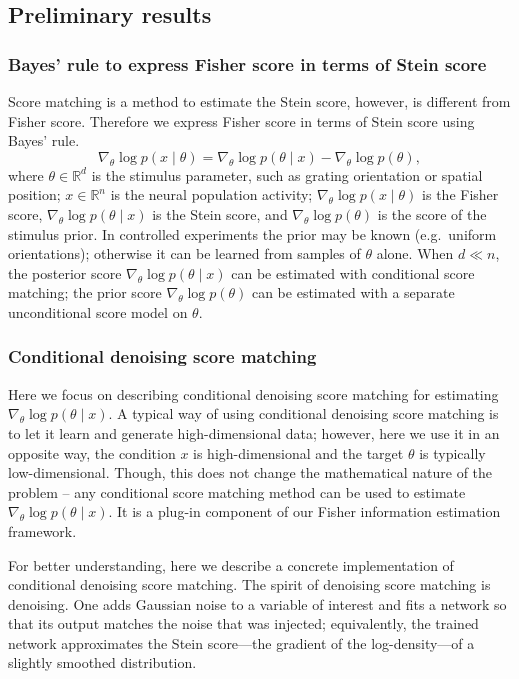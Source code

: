 \subsection{Preliminary results}
\subsubsection{Bayes' rule to express Fisher score in terms of Stein score}

Score matching is a method to estimate the Stein score, however, is different from Fisher score. Therefore we express Fisher score in terms of Stein score using Bayes' rule.
\begin{equation}
\label{eq:fisher-stein}
\nabla_\theta \log p(x\mid\theta) = \nabla_\theta \log p(\theta\mid x) - \nabla_\theta \log p(\theta),
\end{equation}
where $\theta \in \mathbb{R}^d$ is the stimulus parameter, such as grating orientation or spatial position; $x \in \mathbb{R}^n$ is the neural population activity; $\nabla_\theta \log p(x\mid\theta)$ is the Fisher score, $\nabla_\theta \log p(\theta\mid x)$ is the Stein score, and $\nabla_\theta \log p(\theta)$ is the score of the stimulus prior. In controlled experiments the prior may be known (e.g.\ uniform orientations); otherwise it can be learned from samples of $\theta$ alone. When $d\ll n$, the posterior score $\nabla_\theta \log p(\theta\mid x)$ can be estimated with conditional score matching; the prior score $\nabla_\theta \log p(\theta)$ can be estimated with a separate unconditional score model on $\theta$.

\subsubsection{Conditional denoising score matching}
Here we focus on describing conditional denoising score matching for estimating $\nabla_\theta \log p(\theta \mid x)$. A typical way of using conditional denoising score matching is to let it learn and generate high-dimensional data; however, here we use it in an opposite way, the condition $x$ is high-dimensional and the target $\theta$ is typically low-dimensional. Though, this does not change the mathematical nature of the problem -- any conditional score matching method can be used to estimate $\nabla_\theta \log p(\theta \mid x)$. It is a plug-in component of our Fisher information estimation framework.

For better understanding, here we describe a concrete implementation of conditional denoising score matching. The spirit of denoising score matching is denoising. One adds Gaussian noise to a variable of interest and fits a network so that its output matches the noise that was injected; equivalently, the trained network approximates the Stein score---the gradient of the log-density---of a slightly smoothed distribution.

